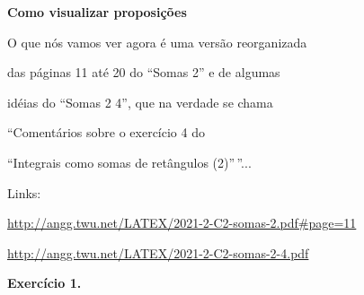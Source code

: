 \documentclass[oneside,12pt]{article}
\begin{document}
\newpage

%                         

{\bf Como visualizar proposições}

O que nós vamos ver agora é uma versão reorganizada

das páginas 11 até 20 do ``Somas 2'' e de algumas

idéias do ``Somas 2 4'', que na verdade se chama

``Comentários sobre o exercício 4 do

``Integrais como somas de retângulos (2)''\,''...

\msk

Links:

\ssk

{\footnotesize

\url{http://angg.twu.net/LATEX/2021-2-C2-somas-2.pdf#page=11}

\url{http://angg.twu.net/LATEX/2021-2-C2-somas-2-4.pdf}

}

\newpage

%                                             

{\bf Exercício 1.}
\end{document}
